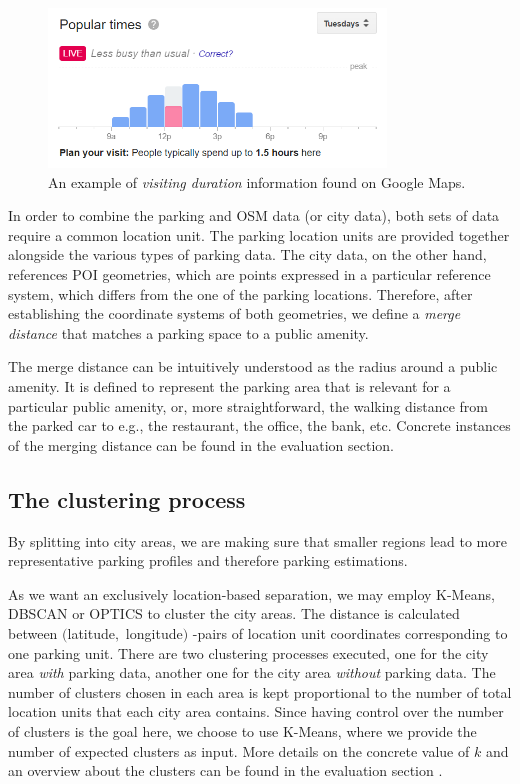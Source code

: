 \documentclass{ws-ijait}
\newcommand{\cmmnt}[1]{\ignorespaces}
\begin{document}
	\begin{figure}[!ht]
		\centering
		\includegraphics[width=0.8\textwidth]{../graphics/google_visit_duration.png}
		\caption{An example of \textit{visiting duration} information found on Google Maps.}
		\label{fig:visit_duration}
	\end{figure}  
	
	In order to combine the parking and OSM data (or city data), both sets of data require a common location unit. The parking location units are provided together alongside the various types of parking data. The city data, on the other hand, references POI geometries, which are points expressed in a particular reference system, which differs from the one of the parking locations. Therefore, after establishing the coordinate systems of both geometries, we define a \textit{merge distance} that matches a parking space to a public amenity. 
	
	The merge distance can be intuitively understood as the radius around a public amenity. It is defined to represent the parking area that is relevant for a particular public amenity, or, more straightforward, the walking distance from the parked car to e.g., the restaurant, the office, the bank, etc. Concrete instances of the merging distance can be found in \cmmnt{\cref{experimental_setup:merging_parking_city_data}} the evaluation section.
	
	\subsection{The clustering process}
	By splitting into city areas, we are making sure that smaller regions lead to more representative parking profiles and therefore parking estimations. 
	
	As we want an exclusively location-based separation, we may employ K-Means, DBSCAN or OPTICS to cluster the city areas. The distance is calculated between $($latitude$,$ longitude$)$ -pairs of location unit coordinates corresponding to one parking unit. There are two clustering processes executed, one for the city area \textit{with} parking data, another one for the city area \textit{without} parking data. The number of clusters chosen in each area is kept proportional to the number of total location units that each city area contains. Since having control over the number of clusters is the goal here, we choose to use K-Means, where we provide the number of expected clusters as input. More details on the concrete value of $k$ and an overview about the clusters can be found in the evaluation section \cmmnt{\cref{experimental_setup:clustering}}.
	
\end{document}

